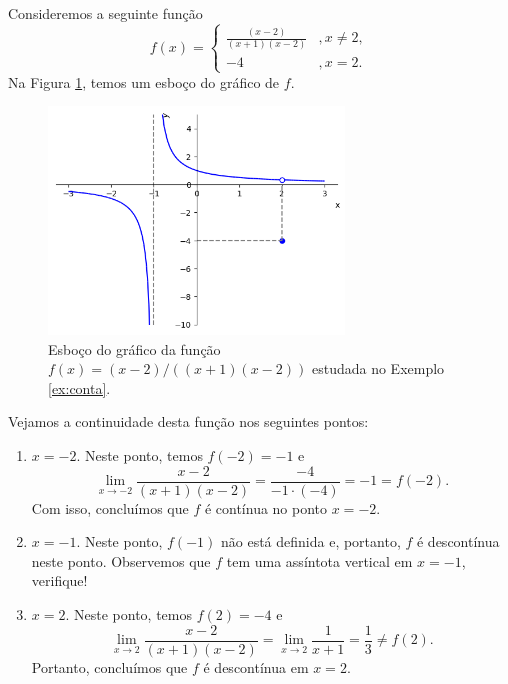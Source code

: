 \begin{ex}\label{ex:conta}
  Consideremos a seguinte função
  \begin{equation}
    f(x) = \left\{
      \begin{array}{ll}
        \frac{(x-2)}{(x+1)(x-2)} &, x\neq 2,\\
        -4 &, x=2.
      \end{array}
\right.
\end{equation}
Na Figura \ref{fig:ex_conta}, temos um esboço do gráfico de $f$.

\begin{figure}[H]
  \centering
  \includegraphics[width=0.7\textwidth]{./cap_lim/dados/fig_ex_conta/fig_ex_conta}
  \caption{Esboço do gráfico da função $f(x) = (x-2)/((x+1)(x-2))$ estudada no Exemplo \ref{ex:conta}.}
  \label{fig:ex_conta}
\end{figure}


Vejamos a continuidade desta função nos seguintes pontos:
\begin{enumerate}
\item $x=-2$. Neste ponto, temos $f(-2) = -1$ e
  \begin{equation}
    \lim_{x\to -2} \frac{x-2}{(x+1)(x-2)} = \frac{-4}{-1\cdot(-4)} = -1 = f(-2).
  \end{equation}
  Com isso, concluímos que $f$ é contínua no ponto $x=-2$.
\item $x=-1$. Neste ponto, $f(-1)$ não está definida e, portanto, $f$ é descontínua neste ponto. Observemos que $f$ tem uma assíntota vertical em $x=-1$, verifique!
\item $x=2$. Neste ponto, temos $f(2)=-4$ e
  \begin{equation}
    \lim_{x\to 2} \frac{x-2}{(x+1)(x-2)} = \lim_{x\to 2} \frac{1}{x+1} = \frac{1}{3} \neq f(2).
  \end{equation}
  Portanto, concluímos que $f$ é descontínua em $x=2$.
\end{enumerate}
\end{ex}

